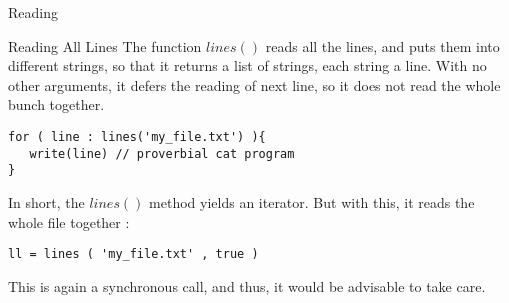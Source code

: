 \begin{section}{Reading}
\begin{subsection}{Reading All Lines}
The function $lines()$ reads all the lines, 
and puts them into different strings, so that it returns 
a list of strings, each string a line.
With no other arguments, it defers the reading of next line, 
so it does not read the whole bunch together.

\begin{lstlisting}[style=JexlStyle]
for ( line : lines('my_file.txt') ){
   write(line) // proverbial cat program 
}
\end{lstlisting}
In short, the $lines()$ method yields an iterator.
But with this, it reads the whole file together :

\begin{lstlisting}[style=JexlStyle]
ll = lines ( 'my_file.txt' , true )
\end{lstlisting}

This is again a synchronous call, and thus, it would 
be advisable to take care.

\end{subsection}

\end{section}

